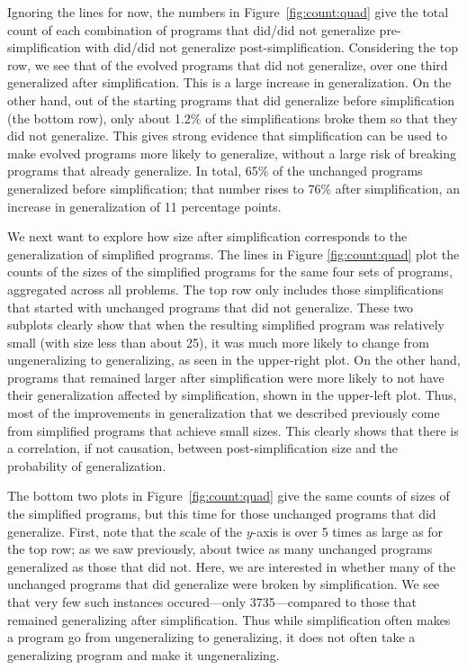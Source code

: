 Ignoring the lines for now, the numbers in Figure~\ref{fig:count:quad} give the total count of each combination of programs that did/did not generalize pre-simplification with  did/did not generalize post-simplification. Considering the top row, we see that of the evolved programs that did not generalize, over one third generalized after simplification. This is a large increase in generalization. On the other hand, out of the starting programs that did generalize before simplification (the bottom row), only about 1.2\% of the simplifications broke them so that they did not generalize. This gives strong evidence that simplification can be used to make evolved programs more likely to generalize, without a large risk of breaking programs that already generalize. In total, 65\% of the unchanged programs generalized before simplification; that number rises to 76\% after simplification, an increase in generalization of 11 percentage points.


We next want to explore how size after simplification corresponds to the generalization of simplified programs. The lines in Figure \ref{fig:count:quad} plot the counts of the sizes of the simplified programs for the same four sets of programs, aggregated across all problems. The top row only includes those simplifications that started with unchanged programs that did not generalize. These two subplots clearly show that when the resulting simplified program was relatively small (with size less than about 25), it was much more likely to change from ungeneralizing to generalizing, as seen in the upper-right plot. On the other hand, programs that remained larger after simplification were more likely to not have their generalization affected by simplification, shown in the upper-left plot. Thus, most of the improvements in generalization that we described previously come from simplified programs that achieve small sizes. This clearly shows that there is a correlation, if not causation, between post-simplification size and the probability of generalization.

The bottom two plots in Figure~\ref{fig:count:quad} give the same counts of sizes of the simplified programs, but this time for those unchanged programs that did generalize. First, note that the scale of the $y$-axis is over 5 times as large as for the top row; as we saw previously, about twice as many unchanged programs generalized as those that did not. Here, we are interested in whether many of the unchanged programs that did generalize were broken by simplification. We see that very few such instances occured---only 3735---compared to those that remained generalizing after simplification. Thus while simplification often makes a program go from ungeneralizing to generalizing, it does not often take a generalizing program and make it ungeneralizing.


